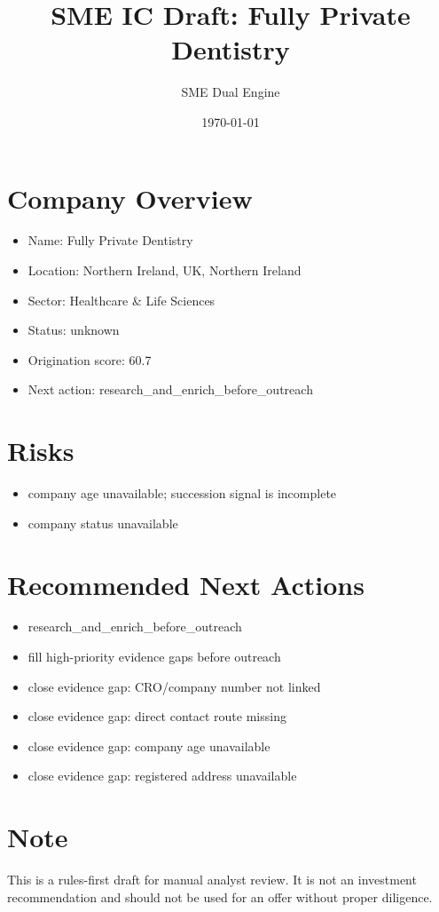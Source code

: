 \documentclass[11pt,a4paper]{article}
\title{SME IC Draft: Fully Private Dentistry}
\author{SME Dual Engine}
\date{\today}
\begin{document}
\maketitle
\section*{Company Overview}
\begin{itemize}[leftmargin=1.4em]
\item Name: Fully Private Dentistry
\item Location: Northern Ireland, UK, Northern Ireland
\item Sector: Healthcare \& Life Sciences
\item Status: unknown
\item Origination score: 60.7
\item Next action: research\_and\_enrich\_before\_outreach
\end{itemize}
\section*{Risks}
\begin{itemize}[leftmargin=1.4em]
\item company age unavailable; succession signal is incomplete
\item company status unavailable
\end{itemize}
\section*{Recommended Next Actions}
\begin{itemize}[leftmargin=1.4em]
\item research\_and\_enrich\_before\_outreach
\item fill high-priority evidence gaps before outreach
\item close evidence gap: CRO/company number not linked
\item close evidence gap: direct contact route missing
\item close evidence gap: company age unavailable
\item close evidence gap: registered address unavailable
\end{itemize}
\section*{Note}
This is a rules-first draft for manual analyst review. It is not an investment
recommendation and should not be used for an offer without proper diligence.
\end{document}
